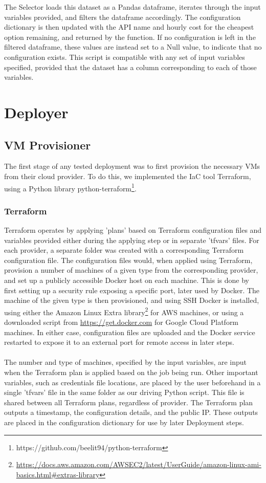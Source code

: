 \documentclass{report}
\begin{document}
The Selector loads this dataset as a Pandas dataframe, iterates through the input variables provided, and filters the dataframe accordingly. The configuration dictionary is then updated with the API name and hourly cost for the cheapest option remaining, and returned by the function. If no configuration is left in the filtered dataframe, these values are instead set to a Null value, to indicate that no configuration exists. This script is compatible with any set of input variables specified, provided that the dataset has a column corresponding to each of those variables.

\section{Deployer}
\subsection{VM Provisioner}
The first stage of any tested deployment was to first provision the necessary VMs from their cloud provider. To do this, we implemented the IaC tool Terraform, using a Python library python-terraform\footnote{https://github.com/beelit94/python-terraform}. 
\subsubsection{Terraform}
Terraform operates by applying 'plans' based on Terraform configuration files and variables provided either during the applying step or in separate 'tfvars' files. For each provider, a separate folder was created with a corresponding Terraform configuration file. The configuration files would, when applied using Terraform, provision a number of machines of a given type from the corresponding provider, and set up a publicly accessible Docker host on each machine. This is done by first setting up a security rule exposing a specific port, later used by Docker. The machine of the given type is then provisioned, and using SSH Docker is installed, using either the Amazon Linux Extra library\footnote{\url{https://docs.aws.amazon.com/AWSEC2/latest/UserGuide/amazon-linux-ami-basics.html\#extras-library}} for AWS machines, or using a downloaded script from \url{https://get.docker.com} for Google Cloud Platform machines. In either case, configuration files are uploaded and the Docker service restarted to expose it to an external port for remote access in later steps.

\paragraph{}
The number and type of machines, specified by the input variables, are input when the Terraform plan is applied based on the job being run. Other important variables, such as credentials file locations, are placed by the user beforehand in a single 'tfvars' file in the same folder as our driving Python script. This file is shared between all Terraform plans, regardless of provider. The Terraform plan outputs a timestamp, the configuration details, and the public IP. These outputs are placed in the configuration dictionary for use by later Deployment steps.
\end{document}
